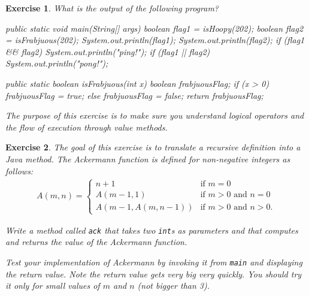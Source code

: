 \documentclass[12pt]{book}
\theoremstyle{exercise}
\newtheorem{exercise}{Exercise}[chapter]
\newcommand{\java}[1]{\verb"#1"}
\begin{document}
\begin{exercise}

What is the output of the following program?

\begin{code}
    public static void main(String[] args) {
        boolean flag1 = isHoopy(202);
        boolean flag2 = isFrabjuous(202);
        System.out.println(flag1);
        System.out.println(flag2);
        if (flag1 && flag2) {
            System.out.println("ping!");
        }
        if (flag1 || flag2) {
            System.out.println("pong!");
        }
    }
\end{code}


\begin{code}
    public static boolean isFrabjuous(int x) {
        boolean frabjuousFlag;
        if (x > 0) {
            frabjuousFlag = true;
        } else {
            frabjuousFlag = false;
        }
        return frabjuousFlag;
    }
\end{code}

The purpose of this exercise is to make sure you understand logical operators and the flow of execution through value methods.

\end{exercise}


\begin{exercise}

The goal of this exercise is to translate a recursive definition into a Java method.
The Ackermann function is defined for non-negative integers as follows:
\begin{eqnarray*}
A(m, n) = \begin{cases}
              n+1 & \mbox{if } m = 0 \\
        A(m-1, 1) & \mbox{if } m > 0 \mbox{ and } n = 0 \\
A(m-1, A(m, n-1)) & \mbox{if } m > 0 \mbox{ and } n > 0.
\end{cases}
\end{eqnarray*}

Write a method called \java{ack} that takes two \java{int}s as parameters and that computes and returns the value of the Ackermann function.

Test your implementation of Ackermann by invoking it from \java{main} and displaying the return value.
Note the return value gets very big very quickly.
You should try it only for small values of $m$ and $n$ (not bigger than 3).

\end{exercise}
\end{document}
